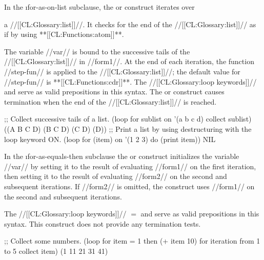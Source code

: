   \endsubsubsubsubsection%

\endsubsubsubsection%


 In the \i{for-as-on-list} subclause, the  or  construct iterates over

a //[[CL:Glossary:list]]//. It checks for the end of the //[[CL:Glossary:list]]// as if by using **[[CL:Functions:atom]]**.

The variable //var// is bound to the successive tails of the  //[[CL:Glossary:list]]// in  //form1//.  At the end of each iteration, the function //step-fun//
 is applied to the //[[CL:Glossary:list]]//; the default value for //step-fun// is **[[CL:Functions:cdr]]**.
 The //[[CL:Glossary:loop keywords]]//  and  serve as valid prepositions in this syntax. The  or  construct causes termination when the end of the //[[CL:Glossary:list]]// is reached.

\code ;; Collect successive tails of a list.
 (loop for sublist on '(a b c d)
       collect sublist) \EV ((A B C D) (B C D) (C D) (D))
  ;; Print a list by using destructuring with the loop keyword ON.
 (loop for (item) on '(1 2 3)
       do (print item))       \EV NIL
  \endcode

\endsubsubsubsubsection%

\endsubsubsubsection%


In the \i{for-as-equals-then} subclause the   or  construct  initializes the variable //var// by setting it to the
  result of evaluating //form1// on the first iteration, then setting
  it to the result of evaluating //form2// on the second and
  subsequent iterations.  If //form2// is omitted, the construct
  uses //form1// on the second and
  subsequent iterations.  

The //[[CL:Glossary:loop keywords]]// {$=$} and  serve as valid prepositions in this syntax.  This construct does not provide any termination tests.

\code ;; Collect some numbers.
 (loop for item = 1 then (+ item 10)
       for iteration from 1 to 5
       collect item) \EV (1 11 21 31 41) \endcode
  \endsubsubsubsubsection%

